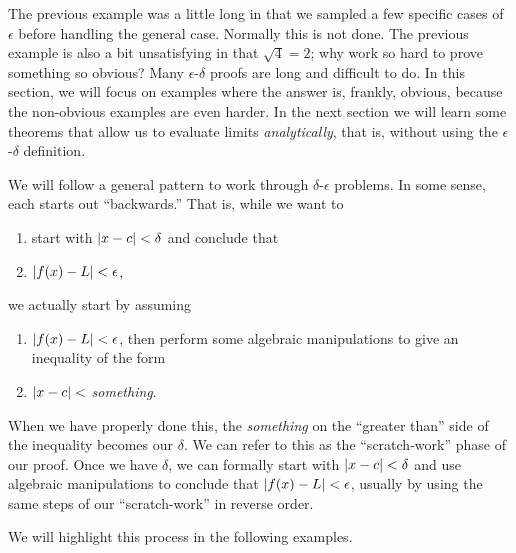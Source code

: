 The previous example was a little long in that we sampled a few specific cases of $\epsilon$ before handling the general case. Normally this is not done.  The previous example is also a bit unsatisfying in that $\sqrt{4}=2$; why work so hard to prove something so obvious? Many $\epsilon$-$\delta$ proofs are long and difficult to do. In this section, we will focus on examples where the answer is, frankly, obvious, because the non-obvious examples are even harder. In the next section we will learn some theorems that allow us to evaluate limits \emph{analytically}, that is, without using the $\epsilon$-$\delta$ definition.

We will follow a general pattern to work through $\delta$-$\epsilon$ problems. In some sense, each starts out ``backwards.'' That is, while we want to
\begin{enumerate}
	\item start with $\left\lvert x-c \right\rvert<\delta$ and conclude that
	\item $\left\lvert f(x)-L \right\rvert<\epsilon$,
\end{enumerate}
we actually start by assuming 
\begin{enumerate}
	\item $\left\lvert f(x)-L \right\rvert<\epsilon$, then perform some algebraic manipulations to give an inequality of the form
	\item $\left\lvert x-c \right\rvert<$ \emph{something}.
\end{enumerate} 
When we have properly done this, the \emph{something} on the ``greater than'' side of the inequality becomes our $\delta$. We can refer to this as the ``scratch-work'' phase of our proof. Once we have $\delta$, we can formally start with $\left\lvert x-c \right\rvert<\delta$ and use algebraic manipulations to conclude that $\left\lvert f(x)-L \right\rvert<\epsilon$, usually by using the same steps of our ``scratch-work'' in reverse order.

We will highlight this process in the following examples.


